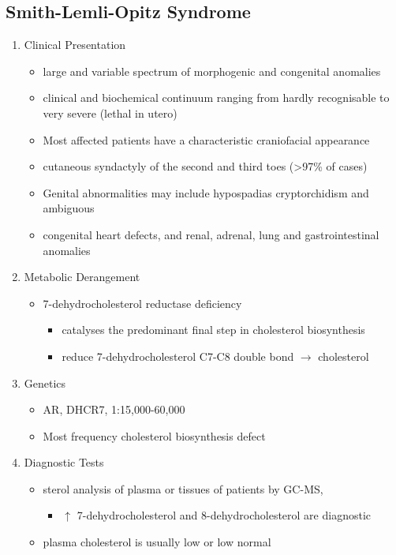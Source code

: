\documentclass{scrartcl}
\begin{document}
\subsection{Smith-Lemli-Opitz Syndrome}
\label{sec:orge8d393d}
\begin{enumerate}
\item Clinical Presentation
\label{sec:org3dd3182}
\begin{itemize}
\item large and variable spectrum of morphogenic and congenital anomalies
\item clinical and biochemical continuum ranging from hardly recognisable
to very severe (lethal in utero)
\item Most affected patients have a characteristic craniofacial appearance
\item cutaneous syndactyly of the second and third toes (>97\% of cases)
\item Genital abnormalities may include hypospadias cryptorchidism and ambiguous
\item congenital heart defects, and renal, adrenal, lung and
gastrointestinal anomalies
\end{itemize}

\item Metabolic Derangement
\label{sec:org8ea963b}
\begin{itemize}
\item 7-dehydrocholesterol reductase deficiency
\begin{itemize}
\item catalyses the predominant final step in cholesterol biosynthesis
\item reduce 7-dehydrocholesterol C7-C8 double bond \(\to\) cholesterol
\end{itemize}
\end{itemize}

\item Genetics
\label{sec:orga84a8bd}
\begin{itemize}
\item AR, DHCR7, 1:15,000-60,000
\item Most frequency cholesterol biosynthesis defect
\end{itemize}

\item Diagnostic Tests
\label{sec:orgcd081d7}
\begin{itemize}
\item sterol analysis of plasma or tissues of patients by GC-MS,
\begin{itemize}
\item \(\uparrow\) 7-dehydrocholesterol and 8-dehydrocholesterol are diagnostic
\end{itemize}
\item plasma cholesterol is usually low or low normal
\end{itemize}


\end{enumerate}
\end{document}
